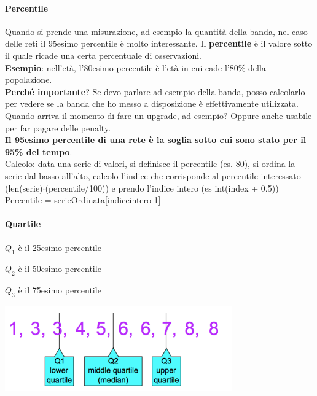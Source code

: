 \documentclass[10pt]{book}
\begin{document}
\paragraph{Percentile} Quando si prende una misurazione, ad esempio la quantità della banda, nel caso delle reti il 95esimo percentile è molto interessante. Il \textbf{percentile} è il valore sotto il quale ricade una certa percentuale di osservazioni.\\
\textbf{Esempio}: nell'età, l'80esimo percentile è l'età in cui cade l'80\% della popolazione.\\
\textbf{Perché importante}? Se devo parlare ad esempio della banda, posso calcolarlo per vedere se la banda che ho messo a disposizione è effettivamente utilizzata. Quando arriva il momento di fare un upgrade, ad esempio? Oppure anche usabile per far pagare delle penalty.\\
\textbf{Il 95esimo percentile di una rete è la soglia sotto cui sono stato per il 95\% del tempo}.\\
Calcolo: data una serie di valori, si definisce il percentile (es. 80), si ordina la serie dal basso all'alto, calcolo l'indice che corrisponde al percentile interessato (len(serie)$\cdot$(percentile/100)) e prendo l'indice intero (es int(index + 0.5))\\
Percentile = serieOrdinata[indiceintero-1]
\paragraph{Quartile} \begin{list}{}{Definiti così:}
		\item $Q_1$ è il 25esimo percentile
		\item $Q_2$ è il 50esimo percentile
		\item $Q_3$ è il 75esimo percentile
\end{list}
\begin{center}
	\includegraphics[scale=1]{quartile.png}
\end{center}
\end{document}
